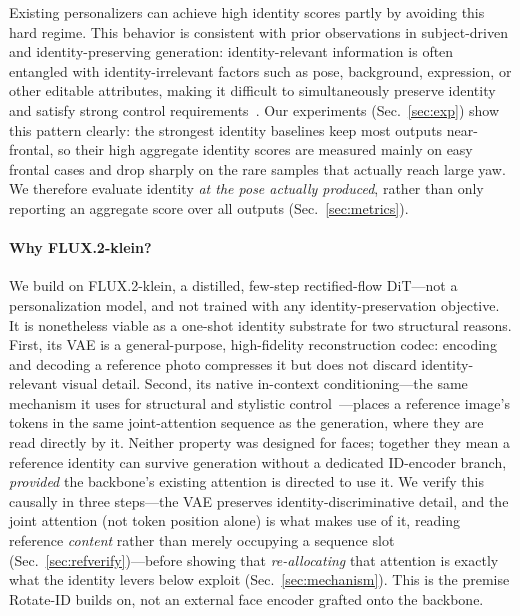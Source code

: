 Existing personalizers can achieve high identity scores partly by avoiding this hard regime.
This behavior is consistent with prior observations in subject-driven and identity-preserving generation: identity-relevant information is often entangled with identity-irrelevant factors such as pose, background, expression, or other editable attributes, making it difficult to simultaneously preserve identity and satisfy strong control requirements~\cite{chen2023disenbooth, masterweaver, hu2025dynamicid, mishima2025facecrafter}.
Our experiments (Sec.~\ref{sec:exp}) show this pattern clearly: the strongest identity baselines keep most outputs near-frontal, so their high aggregate identity scores are measured mainly on easy frontal cases and drop sharply on the rare samples that actually reach large yaw.
We therefore evaluate identity \emph{at the pose actually produced}, rather than only reporting an aggregate score over all outputs (Sec.~\ref{sec:metrics}).


\paragraph{Why FLUX.2-klein?} We build on FLUX.2-klein, a distilled, few-step rectified-flow DiT---not a personalization model, and not trained with any identity-preservation objective. It is nonetheless viable as a one-shot identity substrate for two structural reasons. First, its VAE is a general-purpose, high-fidelity reconstruction codec: encoding and decoding a reference photo compresses it but does not discard identity-relevant visual detail. Second, its native in-context conditioning---the same mechanism it uses for structural and stylistic control~\cite{ominicontrol}---places a reference image's tokens in the same joint-attention sequence as the generation, where they are read directly by it. Neither property was designed for faces; together they mean a reference identity can survive generation without a dedicated ID-encoder branch, \emph{provided} the backbone's existing attention is directed to use it. We verify this causally in three steps---the VAE preserves identity-discriminative detail, and the joint attention (not token position alone) is what makes use of it, reading reference \emph{content} rather than merely occupying a sequence slot (Sec.~\ref{sec:refverify})---before showing that \emph{re-allocating} that attention is exactly what the identity levers below exploit (Sec.~\ref{sec:mechanism}). This is the premise Rotate-ID builds on, not an external face encoder grafted onto the backbone.

